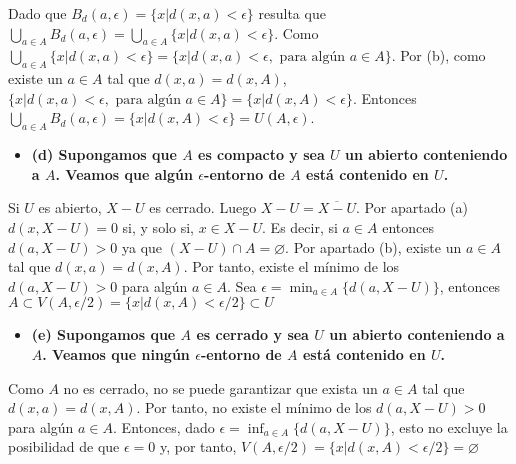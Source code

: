 \documentclass{article}
\begin{document}
Dado que $B_d(a,\epsilon)=\{x|d(x,a)<\epsilon\}$ resulta que $\bigcup_{a\in A}B_d(a,\epsilon)=\bigcup_{a\in A}\{x|d(x,a)<\epsilon\}$. Como $\bigcup_{a\in A}\{x|d(x,a)<\epsilon\}=\{x|d(x,a)<\epsilon, \text{ para algún }a\in A\}$. Por (b), como existe un $a\in A$ tal que $d(x,a)=d(x,A)$, $\{x|d(x,a)<\epsilon, \text{ para algún }a\in A\}=\{x|d(x,A)<\epsilon\}$. Entonces $\bigcup_{a\in A}B_d(a,\epsilon)=\{x|d(x,A)<\epsilon\}= U(A,\epsilon)$.
\begin{itemize}
\item \bf (d) \rm Supongamos que $A$ es compacto y sea $U$ un abierto conteniendo a $A$. Veamos que algún $\epsilon$-entorno de $A$ está contenido en $U$.
\end{itemize}
Si $U$ es abierto, $X-U$ es cerrado. Luego $X-U=\overline{X-U}$. Por apartado (a) $d(x, X-U)=0$ si, y solo si, $x\in X-U$. Es decir, si $a\in A$ entonces $d(a, X-U)>0$ ya que $ \left(X-U\right)\cap A=\varnothing$. Por apartado (b), existe un $a\in A$ tal que $d(x,a)=d(x,A)$. Por tanto, existe el mínimo de los $d(a, X-U)>0$ para algún $a\in A$. Sea $\epsilon= \min_{a\in A}\{d(a,X-U)\}$, entonces $A\subset V(A,\epsilon/2)=\{x|d(x,A)<\epsilon/2\}\subset U$
\begin{itemize}
\item \bf (e) \rm Supongamos que $A$ es cerrado y sea $U$ un abierto conteniendo a $A$. Veamos que ningún $\epsilon$-entorno de $A$ está contenido en $U$.
\end{itemize}
Como $A$ no es cerrado, no se puede garantizar que exista un $a\in A$ tal que $d(x,a)=d(x,A)$. Por tanto, no existe el mínimo de los $d(a, X-U)>0$ para algún $a\in A$. Entonces, dado $\epsilon=\inf_{a\in A}\{d(a,X-U)\}$, esto no excluye la posibilidad de que $\epsilon =0$ y, por tanto, $V(A,\epsilon/2)=\{x|d(x,A)<\epsilon/2\}=\varnothing$
\end{document}
